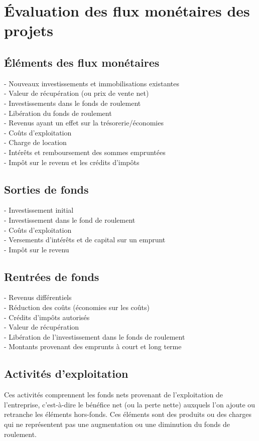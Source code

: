 \section{Évaluation des flux monétaires des projets}

\subsection{Éléments des flux monétaires}

- Nouveaux investissements et immobilisations existantes \\
- Valeur de récupération (ou prix de vente net) \\
- Investissements dans le fonds de roulement \\
- Libération du fonds de roulement \\
- Revenus ayant un effet sur la trésorerie/économies\\
- Coûts d'exploitation\\
- Charge de location\\
- Intérêts et remboursement des sommes empruntées\\
- Impôt sur le revenu et les crédits d'impôts

\subsection{Sorties de fonds}
- Investissement initial\\
- Investissement dans le fond de roulement\\
- Coûts d'exploitation\\
- Versements d'intérêts et de capital sur un emprunt\\
- Impôt sur le revenu\\

\subsection{Rentrées de fonds}
- Revenus différentiels\\
- Réduction des coûts (économies sur les coûts)\\
- Crédits d'impôts autorisés\\
- Valeur de récupération\\
- Libération de l'investissement dans le fonds de roulement\\
- Montants provenant des emprunts à court et long terme

\subsection{Activités d'exploitation}
Ces activités comprennent les fonds nets provenant de l'exploitation de l'entreprise, c'est-à-dire le bénéfice net (ou la perte nette) auxquels l'on ajoute ou retranche les éléments hors-fonds. Ces éléments sont des produits ou des charges qui ne représentent pas une augmentation ou une diminution du fonds de roulement.

